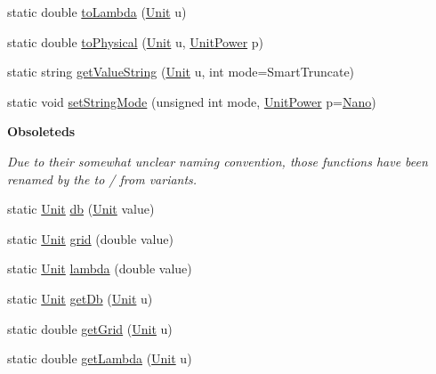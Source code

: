 \begin{DoxyCompactItemize}
\item 
static double \hyperlink{group__DbUGroup_ga4923a9a443871282ad7d331be2a2a5d4}{to\-Lambda} (\hyperlink{group__DbUGroup_ga4fbfa3e8c89347af76c9628ea06c4146}{Unit} u)
\item 
static double \hyperlink{group__DbUGroup_gab901e9d5c12e878728178f113def6c45}{to\-Physical} (\hyperlink{group__DbUGroup_ga4fbfa3e8c89347af76c9628ea06c4146}{Unit} u, \hyperlink{group__DbUGroup_ga50b5785bf4d75026c4c112caec3040a7}{Unit\-Power} p)
\item 
static string \hyperlink{group__DbUGroup_gadc9c1a06b4296dbddcf711077113f4bd}{get\-Value\-String} (\hyperlink{group__DbUGroup_ga4fbfa3e8c89347af76c9628ea06c4146}{Unit} u, int mode=Smart\-Truncate)
\item 
static void \hyperlink{group__DbUGroup_ga89ab8f8326c54113336086663ecf1d25}{set\-String\-Mode} (unsigned int mode, \hyperlink{group__DbUGroup_ga50b5785bf4d75026c4c112caec3040a7}{Unit\-Power} p=\hyperlink{group__DbUGroup_gga50b5785bf4d75026c4c112caec3040a7a03e5923be5810db830626f2ca26319d6}{Nano})
\end{DoxyCompactItemize}
\begin{Indent}{\bf Obsoleteds}\par
{\em Due to their somewhat unclear naming convention, those functions have been renamed by the {\itshape to} / {\itshape from} variants. }\begin{DoxyCompactItemize}
\item 
static \hyperlink{group__DbUGroup_ga4fbfa3e8c89347af76c9628ea06c4146}{Unit} \hyperlink{group__DbUGroup_gacd77957381fb93fc4203bdca215e0b48}{db} (\hyperlink{group__DbUGroup_ga4fbfa3e8c89347af76c9628ea06c4146}{Unit} value)
\item 
static \hyperlink{group__DbUGroup_ga4fbfa3e8c89347af76c9628ea06c4146}{Unit} \hyperlink{group__DbUGroup_ga1d4bac6e3b68c8cd44b345de3b425753}{grid} (double value)
\item 
static \hyperlink{group__DbUGroup_ga4fbfa3e8c89347af76c9628ea06c4146}{Unit} \hyperlink{group__DbUGroup_gaa1ba98acc939ff1c370c18544a5e0dce}{lambda} (double value)
\item 
static \hyperlink{group__DbUGroup_ga4fbfa3e8c89347af76c9628ea06c4146}{Unit} \hyperlink{group__DbUGroup_ga4233772b1b3e68f3ec723c7509ea87ff}{get\-Db} (\hyperlink{group__DbUGroup_ga4fbfa3e8c89347af76c9628ea06c4146}{Unit} u)
\item 
static double \hyperlink{group__DbUGroup_gad4485d0d7b5fd7ae87b32f165155c0a2}{get\-Grid} (\hyperlink{group__DbUGroup_ga4fbfa3e8c89347af76c9628ea06c4146}{Unit} u)
\item 
static double \hyperlink{group__DbUGroup_gadea6b9a6e84243f70f3a5e2725b2c6d8}{get\-Lambda} (\hyperlink{group__DbUGroup_ga4fbfa3e8c89347af76c9628ea06c4146}{Unit} u)
\end{DoxyCompactItemize}
\end{Indent}


